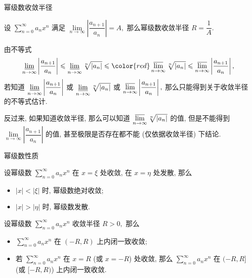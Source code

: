 \begin{frame}{幂级数收敛半径}

\begin{thm}
设 $\sum\limits_{n=0}^\infty a_n x^n$ 满足 $\lim\limits_{n\to\infty} \left\lvert \dfrac{a_{n+1}}{a_n} \right\rvert = A,$ 那么幂级数收敛半径 $R = \dfrac{1}{A}.$
\end{thm}

\pause

\begin{attnblock}
由不等式
\vspace{-0.5em}
\[\varliminf\limits_{n\to\infty} \left\lvert \dfrac{a_{n+1}}{a_n} \right\rvert \leqslant \varliminf\limits_{n\to\infty} \sqrt[n]{\left\lvert a_n \right\rvert} \leqslant {\color{red}\varlimsup\limits_{n\to\infty} \sqrt[n]{\left\lvert a_n \right\rvert}} \leqslant \varlimsup\limits_{n\to\infty} \left\lvert \dfrac{a_{n+1}}{a_n} \right\rvert,\]
若知道 $\varliminf\limits_{n\to\infty} \left\lvert \dfrac{a_{n+1}}{a_n} \right\rvert$ 或 $\varliminf\limits_{n\to\infty} \sqrt[n]{\left\lvert a_n \right\rvert}$ 或 $\varlimsup\limits_{n\to\infty} \left\lvert \dfrac{a_{n+1}}{a_n} \right\rvert,$ 那么只能得到关于收敛半径的不等式估计.

\pause

反过来, 如果知道收敛半径, 那么可以知道 $\varlimsup\limits_{n\to\infty} \sqrt[n]{\left\lvert a_n \right\rvert}$ 的值, 但是不能得到 $\lim\limits_{n\to\infty} \left\lvert \dfrac{a_{n+1}}{a_n} \right\rvert$ 的值, 甚至极限是否存在都不能 (仅依据收敛半径) 下结论.

\end{attnblock}

\end{frame}


\begin{frame}{幂级数性质}

\begin{thm}
设幂级数 $\sum\limits_{n=0}^\infty a_n x^n$ 在 $x = \xi$ 处收敛, 在 $x = \eta$ 处发散, 那么
\begin{itemize}
\item $\lvert x \rvert < \lvert \xi \rvert$ 时, 幂级数绝对收敛;
\item $\lvert x \rvert > \lvert \eta \rvert$ 时, 幂级数发散.
\end{itemize}
\end{thm}

\pause

\begin{thm}
设幂级数 $\sum\limits_{n=0}^\infty a_n x^n$ 收敛半径 $R > 0,$ 那么
\begin{itemize}
\item $\sum\limits_{n=0}^\infty a_n x^n$ 在 $(-R, R)$ 上内闭一致收敛;
\item 若 $\sum\limits_{n=0}^\infty a_n x^n$ 在 $x = R$ (或 $x = -R$) 处收敛, 那么 $\sum\limits_{n=0}^\infty a_n x^n$ 在 $(-R, R]$ (或 $[-R, R)$) 上内闭一致收敛.
\end{itemize}
\end{thm}

\end{frame}

